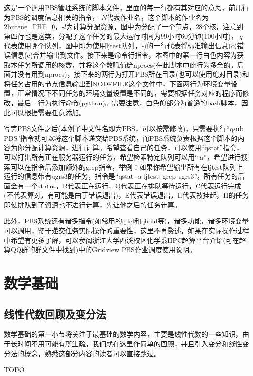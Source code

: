 \documentclass{article}
\numberwithin{equation}{section}
\begin{document}
    这是一个调用PBS管理系统的脚本文件，里面的每一行都有其对应的意思，前几行为PBS的调度信息相关的指令，-$N$代表作业名，这个脚本的作业名为2butene\_PBE\_0，-$l$为计算分配资源，图中为分配了一个节点，28个核，注意到第四行也是这类，分配了这个任务的最大运行时间为99小时60分钟(100小时)，-$q$代表使用哪个队列，图中即为使用ljtest队列，-$j$的一行代表将标准输出信息(o)错误信息(e)合并输出到文件。接下来是命令行指令，本图中的第一行白色内容为获取本任务所调用的核数，并将这个数赋值给nprocs(在此脚本中此行为多余的，后面并没有用到nprocs)，接下来的两行为打开PBS所在目录(也可以使用绝对目录)和将任务占用的节点信息输出到NODEFILE这个文件中，下面两行为环境变量设置，正常情况下不同任务的环境变量设置是不同的，需要根据任务对应的程序而修改，最后一行为执行命令(python)。需要注意，白色的部分为普通的bash脚本，因此可以根据需要任意添加。

    写完PBS文件之后(本例子中文件名即为PBS，可以按需修改)，只需要执行“qsub PBS”指令就可以将这个脚本递交给PBS系统，而PBS系统负责根据这个脚本的内容为你分配计算资源，进行计算。希望查看自己的任务，可以使用“qstat”指令，可以打出所有正在服务器运行的任务，希望检索特定队列可以用“-a”，希望进行搜索可以在指令后添加额外的grep指令，举例：如果你希望输出所有在ljtest队列上运行的信息带有ugrs3的任务，指令是“qstat -a ljtest |grep ugrs3”。所有任务的后面会有一个status，R代表正在运行，Q代表正在排队等待运行，C代表运行完成(不代表算对，有可能是由于错误退出)，E代表错误退出，H代表被挂起，H的任务即使排队到了资源也不进行计算，先让他之后的任务计算。

    此外，PBS系统还有诸多指令(如常用的qdel和qhold等)，诸多功能，诸多环境变量可以调用，鉴于递交任务实际操作的重要性，这里不再赘述，如果在实际操作过程中希望有更多了解，可以参阅浙江大学西溪校区化学系HPC超算平台介绍(可在超算QQ群的群文件中找到)中的Gridview PBS作业调度使用说明。
    
    \section{数学基础}
    \subsection{线性代数回顾及变分法}
    数学基础的第一小节将关注于最基础的数学内容，主要是线性代数的一些知识，由于长时间不用可能有所生疏，我们就在这里作简单的回顾，并且引入变分和线性变分法的概念，熟悉这部分内容的读者可以直接跳过。

    TODO
\end{document}
